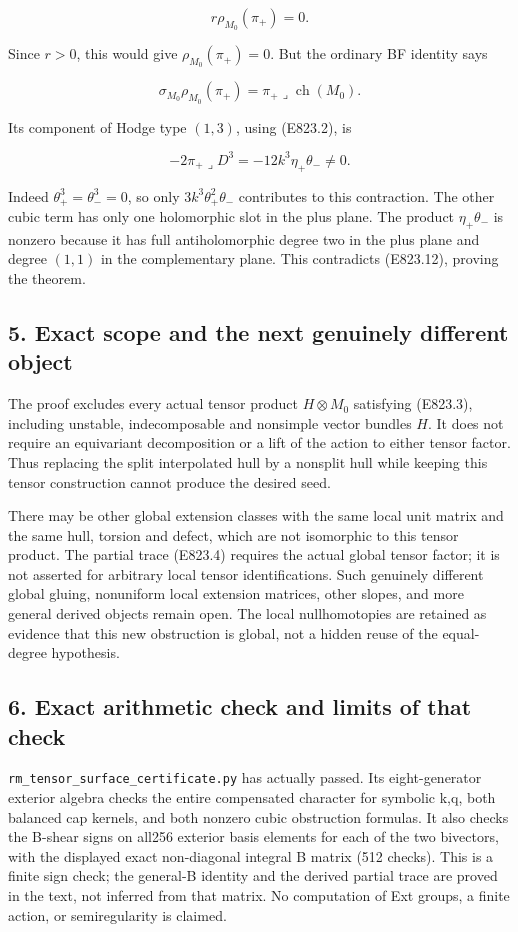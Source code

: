 \[
 r\rho_{M_0}(\pi_+)=0.
 \tag{E823.12}
\]

Since \(r>0\), this would give \(\rho_{M_0}(\pi_+)=0\). But the ordinary
BF identity says

\[
 \sigma_{M_0}\rho_{M_0}(\pi_+)
       =\pi_+\mathbin{\lrcorner}\operatorname{ch}(M_0).
 \tag{E823.13}
\]

Its component of Hodge type \((1,3)\), using (E823.2), is

\[
 -2\pi_+\mathbin{\lrcorner}D^3
       =-12k^3\eta_+\theta_-\ne0.
 \tag{E823.14}
\]

Indeed \(\theta_+^3=\theta_-^3=0\), so only \(3k^3\theta_+^2\theta_-\)
contributes to this contraction. The other cubic term has only one
holomorphic slot in the plus plane. The product \(\eta_+\theta_-\) is
nonzero because it has full antiholomorphic degree two in the plus plane
and degree \((1,1)\) in the complementary plane. This contradicts
(E823.12), proving the theorem.

\subsection{5. Exact scope and the next genuinely different
object}\label{SF-E823-exact-scope-and-the-next-genuinely-different-object}

The proof excludes every actual tensor product \(H\otimes M_0\)
satisfying (E823.3), including unstable, indecomposable and nonsimple
vector bundles \(H\). It does not require an equivariant decomposition
or a lift of the action to either tensor factor. Thus replacing the
split interpolated hull by a nonsplit hull while keeping this tensor
construction cannot produce the desired seed.

There may be other global extension classes with the same local unit
matrix and the same hull, torsion and defect, which are not isomorphic
to this tensor product. The partial trace (E823.4) requires the actual
global tensor factor; it is not asserted for arbitrary local tensor
identifications. Such genuinely different global gluing, nonuniform
local extension matrices, other slopes, and more general derived objects
remain open. The local nullhomotopies are retained as evidence that this
new obstruction is global, not a hidden reuse of the equal-degree
hypothesis.

\subsection{6. Exact arithmetic check and limits of that
check}\label{SF-E823-exact-arithmetic-check-and-limits-of-that-check}

\texttt{rm\_tensor\_surface\_certificate.py} has actually passed. Its
eight-generator exterior algebra checks the entire compensated character
for symbolic k,q, both balanced cap kernels, and both nonzero cubic
obstruction formulas. It also checks the B-shear signs on all256
exterior basis elements for each of the two bivectors, with the
displayed exact non-diagonal integral B matrix (512 checks). This is a
finite sign check; the general-B identity and the derived partial trace
are proved in the text, not inferred from that matrix. No computation of
Ext groups, a finite action, or semiregularity is claimed.
